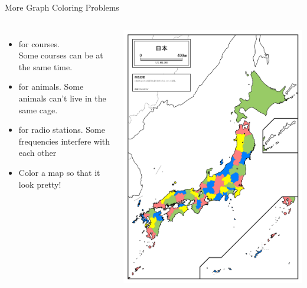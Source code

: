 \begin{frame}{More Graph Coloring Problems}
    \begin{columns}
      \begin{itemize}
      \item {} for courses.\\
        Some courses can be \alert{at the same time}.
        \medskip

      \item {} for animals.
        Some animals \alert{can't live in the same cage}.
        \medskip

      \item {} for radio stations.
        Some frequencies \alert{interfere with each other}
        \medskip

      \item Color a map so that it look pretty!
      \end{itemize}

      \includegraphics[height=.8\textheight]{../img/japan4color}
    \end{columns}
\end{frame}

